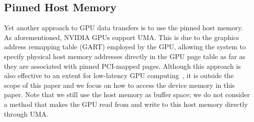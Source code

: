 \subsection{Pinned Host Memory}

Yet another approach to GPU data transfers is to use the pinned host
memory.
As aforementioned, NVIDIA GPUs support UMA.
This is due to the graphics address remapping table (GART) employed by
the GPU, allowing the system to specify physical host memory addresses
directly in the GPU page table as far as they are associated with pinned
PCI-mapped pages.
Although this approach is also effective to an extent for low-latency
GPU computing~\cite{Kato_ICCPS13}, it is outside the scope of this
paper and we focus on how to access the device memory in this paper.
Note that we still use the host memory as buffer space; we do not
consider a method that makes the GPU read from and write to this host
memory directly through UMA.
